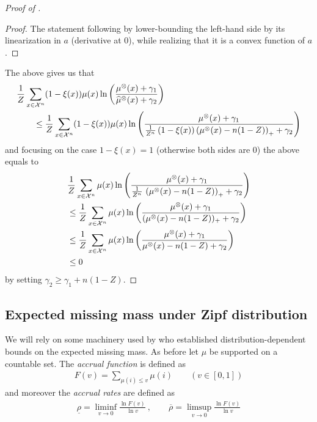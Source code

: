 \begin{proof}[Proof of ]
\begin{proof}
  The statement following by lower-bounding the left-hand side by its linearization in $a$ (derivative at $0$), while realizing that it is a convex function of $a$.
\end{proof}
% 
The above gives us that
%
\begin{align*}
  &\frac{1}{Z}\sum_{x \in {\mathcal{X}}^n} (1-\xi(x)) \mu(x) \ln \left(  \frac{\mu^{\otimes}(x) + \gamma_1}{\widehat \mu^{\otimes}(x) + \gamma_2} \right)\\
  &\qquad\leq
    \frac{1}{Z}\sum_{x \in {\mathcal{X}}^n} (1-\xi(x)) \mu(x) \ln \left(  \frac{\mu^{\otimes}(x) + \gamma_1}{\frac{1}{Z^n} \, (1-\xi(x)) \left(  \mu^{\otimes}(x) - n (1 - Z) \right)_+ + \gamma_2} \right)
\end{align*}
%
and focusing on the case $1 - \xi(x) = 1$ (otherwise both sides are $0$) the above equals to
\begin{align*}
  &\frac{1}{Z}\sum_{x \in {\mathcal{X}}^n} \mu(x) \ln \left(  \frac{\mu^{\otimes}(x) + \gamma_1}{\frac{1}{Z^n} \, \left(  \mu^{\otimes}(x) - n (1 - Z) \right)_+ + \gamma_2} \right)\\
  &\leq
    \frac{1}{Z}\sum_{x \in {\mathcal{X}}^n} \mu(x) \ln \left(  \frac{\mu^{\otimes}(x) + \gamma_1}{(\mu^{\otimes}(x) - n (1 - Z))_+ + \gamma_2} \right)\\
  &\leq
    \frac{1}{Z}\sum_{x \in {\mathcal{X}}^n} \mu(x) \ln \left(  \frac{\mu^{\otimes}(x) + \gamma_1}{\mu^{\otimes}(x) - n (1 - Z) + \gamma_2} \right)\\
  &\leq 0
\end{align*}
by setting $\gamma_2 \geq \gamma_1 + n (1-Z)$.
\end{proof}

\subsection{Expected missing mass under Zipf distribution}
\label{sec:zipf}
%
We will rely on some machinery used by \cite{ohannessian2010distribution} who
established distribution-dependent bounds on the expected missing mass.
%
As before let $\mu$ be supported on a countable set.
The \emph{accrual function} is defined as
\begin{align*}
  F(v) = \sum_{\mu(i) \leq v} \mu(i) \qquad (v \in [0,1])
\end{align*}
and moreover the \emph{accrual rates} are defined as
\begin{align*}
  \underline{\rho} = \liminf_{v \to 0} \frac{\ln F(v)}{\ln v}~, \qquad
  \overline{\rho} = \limsup_{v \to 0} \frac{\ln F(v)}{\ln v}
\end{align*}


